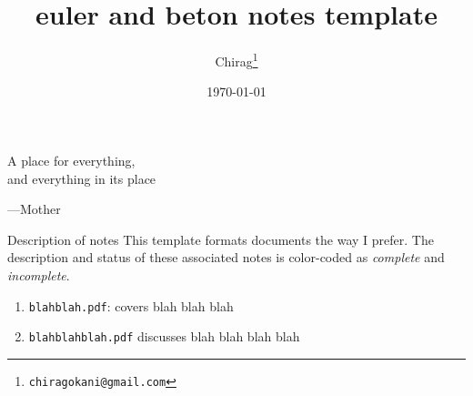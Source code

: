 \documentclass[12pt]{article}
\title{\textsf{euler} and \textsf{beton} notes template}
\author{Chirag\footnote{\texttt{chiragokani@gmail.com}}} %
\date{\today}
\numberwithin{equation}{section}
\begin{document}
\maketitle
\setlength{\epigraphwidth}{0.31\textwidth}
\epigraph{\Fontlukas A place for everything,\\and everything in its place}{\Fontlukas---Mother}

\begin{graytext}{Description of notes}
This template formats documents the way I prefer. The description and status of these associated notes is color-coded as \color{cyan}\textit{complete} \color{black} and  \color{magenta}\textit{incomplete}\color{black}.
\begin{enumerate}[label=(\alph*)]
\item \color{cyan}\texttt{blahblah.pdf}: covers blah blah blah \color{black} 
\item \color{magenta}\texttt{blahblahblah.pdf} discusses blah blah blah blah \color{black} 
\end{enumerate}
\end{graytext}
\tableofcontents
\end{document}
